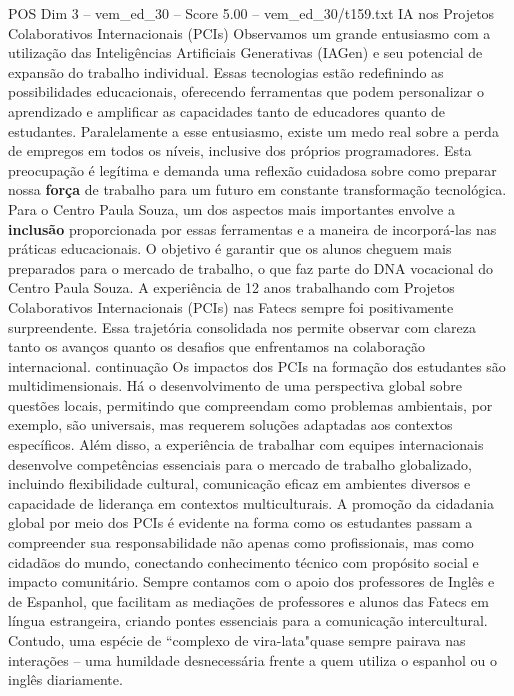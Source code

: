\begin{textsample}{POS Dim 3 – vem\_ed\_30 – Score 5.00 – vem\_ed\_30/t159.txt}  \label{ex:f3_pos_113}
IA nos Projetos Colaborativos Internacionais (PCIs) Observamos um grande entusiasmo com a utilização das Inteligências Artificiais Generativas (IAGen) e seu potencial de expansão do trabalho individual.
Essas tecnologias estão redefinindo as possibilidades educacionais, oferecendo ferramentas que podem personalizar o aprendizado e amplificar as capacidades tanto de educadores quanto de estudantes.
Paralelamente a esse entusiasmo, existe um medo real sobre a perda de empregos em todos os níveis, inclusive dos próprios programadores.
Esta preocupação é legítima e demanda uma reflexão cuidadosa sobre como preparar nossa \textbf{força} de trabalho para um futuro em constante transformação tecnológica.
Para o Centro Paula Souza, um dos aspectos mais importantes envolve a \textbf{inclusão} proporcionada por essas ferramentas e a maneira de incorporá-las nas práticas educacionais.
O objetivo é garantir que os alunos cheguem mais preparados para o mercado de trabalho, o que faz parte do DNA vocacional do Centro Paula Souza.
A experiência de 12 anos trabalhando com Projetos Colaborativos Internacionais (PCIs) nas Fatecs sempre foi positivamente surpreendente.
Essa trajetória consolidada nos permite observar com clareza tanto os avanços quanto os desafios que enfrentamos na colaboração internacional. continuação Os impactos dos PCIs na formação dos estudantes são multidimensionais.
Há o desenvolvimento de uma perspectiva global sobre questões locais, permitindo que compreendam como problemas ambientais, por exemplo, são universais, mas requerem soluções adaptadas aos contextos específicos.
Além disso, a experiência de trabalhar com equipes internacionais desenvolve competências essenciais para o mercado de trabalho globalizado, incluindo flexibilidade cultural, comunicação eficaz em ambientes diversos e capacidade de liderança em contextos multiculturais.
A promoção da cidadania global por meio dos PCIs é evidente na forma como os estudantes passam a compreender sua responsabilidade não apenas como profissionais, mas como cidadãos do mundo, conectando conhecimento técnico com propósito social e impacto comunitário.
Sempre contamos com o apoio dos professores de Inglês e de Espanhol, que facilitam as mediações de professores e alunos das Fatecs em língua estrangeira, criando pontes essenciais para a comunicação intercultural.
Contudo, uma espécie de “complexo de vira-lata"quase sempre pairava nas interações – uma humildade desnecessária frente a quem utiliza o espanhol ou o inglês diariamente.

\end{textsample}
